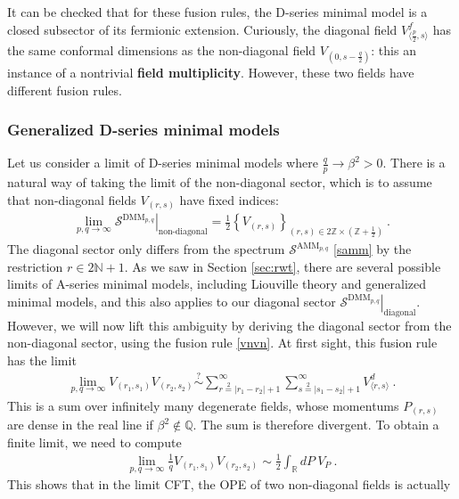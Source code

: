 \documentclass[12pt, a4paper]{article}
\theoremstyle{break}
\begin{document}
It can be checked that for these fusion rules, the D-series minimal model is a closed subsector of its fermionic extension. Curiously, the diagonal field $V^f_{\langle \frac{p}{2}, s\rangle}$ has the same conformal dimensions as the non-diagonal field $V_{(0,s-\frac{q}{2})}$: this an instance of a nontrivial \textbf{field multiplicity}. However, these two fields have different fusion rules. 

\subsubsection{Generalized D-series minimal models}\label{sec:gdmm}

Let us consider a limit of D-series minimal models where $\frac{q}{p}\to \beta^2>0$. There is a natural way of taking the limit of the non-diagonal sector, which is to assume that non-diagonal fields $V_{(r,s)}$ have fixed indices:
\begin{align}
 \lim_{p,q\to\infty} \left. \mathcal{S}^{\text{DMM}_{p,q}} \right|_{\text{non-diagonal}} = 
 \frac12\left\{V_{(r,s)} \right\}_{ (r,s)\in 2\mathbb{Z}\times (\mathbb{Z}+\frac12)}\ .
\end{align}
The diagonal sector only differs from the spectrum $\mathcal{S}^{\text{AMM}_{p,q}}$ \eqref{samm} by the restriction $r\in 2\mathbb{N}+1$. 
As we saw in Section \ref{sec:rwt}, there are several possible limits of A-series minimal models, including Liouville theory and generalized minimal models, and this also applies to our diagonal sector $\left. \mathcal{S}^{\text{DMM}_{p,q}} \right|_{\text{diagonal}} $. However, we will now lift this ambiguity by deriving the diagonal sector from the non-diagonal sector, using the fusion rule \eqref{vnvn}. At first sight, this fusion rule has the limit  
\begin{align}
 \lim_{p,q\to\infty} V_{(r_1,s_1)} V_{(r_2,s_2)}  \overset{?}{\sim} \sum_{r\overset{2}{=}|r_1-r_2|+1}^{\infty} \sum_{s\overset{2}{=}|s_1-s_2|+1}^{\infty} V^d_{\langle r,s\rangle}\ .
\end{align}
This is a sum over infinitely many degenerate fields, whose momentums $P_{(r,s)}$ are dense in the real line if $\beta^2\notin \mathbb{Q}$. The sum is therefore divergent. To obtain a finite limit, we need to compute 
\begin{align}
 \lim_{p,q\to\infty} \frac{1}{q} V_{(r_1,s_1)} V_{(r_2,s_2)} \sim \frac12 \int_\mathbb{R} dP \ V_P\ .
\end{align}
This shows that in the limit CFT, the OPE of two non-diagonal fields is actually 
\end{document}
